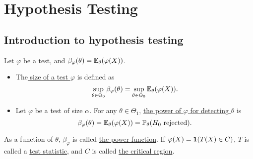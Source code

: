 \section{Hypothesis Testing}
\subsection{Introduction to hypothesis testing}

\begin{comment} 
\begin{tabular}{ c | l  }
\hline
\textbf{Notations} & \textbf{Descriptions} \\ 
\hline
$\mu$& $=\mathbb{E}(X)$\\
$\Sigma$& $=\mathrm{Var}(X)$\\
$\sigma_{YX}$& $=\mathbb{E}[Y(X-\mu)]$\\
\hline 
\end{tabular}
\end{comment}

\begin{mydef} Let $\varphi$ be a test, and $\beta_\varphi (\theta) = \mathbb{E}_\theta (\varphi(X))$.
	\begin{itemize}
		
		\item The\uline{ size of a test $\varphi$} is defined as 
		$$\sup_{\theta \in \Theta_0} \beta_\varphi (\theta) = \sup_{\theta \in \Theta_0} \mathbb{E}_\theta (\varphi(X)).$$ 
		
		\item Let $\varphi$ be a test of size $\alpha$. For any $\theta \in \Theta_1$, \uline{the power of $\varphi$ for detecting $\theta$} is 
		$$\beta_\varphi (\theta) = \mathbb{E}_\theta (\varphi(X)) = \mathbb{P}_\theta ( H_0 \text{ rejected} ).$$
	\end{itemize} 
\end{mydef} 
\begin{remark}
	As a function of $\theta$, $\beta_\varphi$ is called \uline{the power function}. If $\varphi(X) = \boldsymbol{1}( T(X) \in C )$, $T$ is called a \uline{test statistic}, and $C$ is called \uline{the critical region}.
\end{remark}

